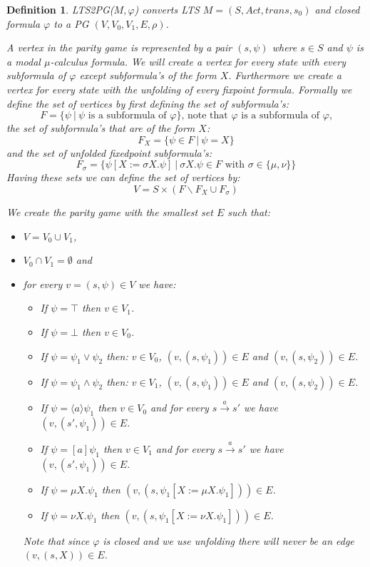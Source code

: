 \documentclass[]{article}
\newtheorem{definition}{Definition}[section]
\begin{document}
\begin{definition}
	\label{def_LTS2PG}\cite{Bradfield2018}
	LTS2PG($M, \varphi$) converts LTS $M = (S, Act, trans, s_0)$ and closed formula $\varphi$ to a PG $(V, V_0, V_1, E, \rho)$.
	
	A vertex in the parity game is represented by a pair $(s, \psi)$ where $s \in S$ and $\psi$ is a modal $\mu$-calculus formula. We will create a vertex for every state with every subformula of $\varphi$ except subformula's of the form $X$. Furthermore we create a vertex for every state with the unfolding of every fixpoint formula. Formally we define the set of vertices by first defining the set of subformula's:
	\[ F = \{ \psi\ |\ \psi \text{ is a subformula of } \varphi \} \text{, note that $\varphi$ is a subformula of $\varphi$,} \]
	the set of subformula's that are of the form $X$:
	\[ F_X = \{ \psi \in F\ |\ \psi = X\} \]
	and the set of unfolded fixedpoint subformula's:
	 \[ F_\sigma = \{\psi[X:=\sigma X. \psi]\ |\ \sigma X. \psi \in F \text{ with } \sigma \in \{\mu, \nu\}\} \]
	Having these sets we can define the set of vertices by:
	\[ V = S \times (F \backslash F_X \cup F_{\sigma})\]
	
	We create the parity game with the smallest set $E$ such that:
	\begin{itemize}
		\item $V = V_0 \cup V_1$,
		\item $V_0 \cap V_1 = \emptyset$ and
		\item for every $v = (s, \psi) \in V$ we have:
		\begin{itemize}
			\item If $\psi = \top$ then $v \in V_1$.
			\item If $\psi = \bot$ then $v \in V_0$.
			\item If $\psi = \psi_1 \vee \psi_2$ then:
				\subitem $v \in V_0$,
				\subitem $(v, (s,\psi_1)) \in E$ and
				\subitem $(v, (s,\psi_2)) \in E$.
			\item If $\psi = \psi_1 \wedge \psi_2$ then:
				\subitem $v \in V_1$,
				\subitem $(v, (s,\psi_1)) \in E$ and
				\subitem $(v, (s,\psi_2)) \in E$.
			\item If $\psi = \langle a \rangle \psi_1$ then $v \in V_0$ and for every $s \xrightarrow{ a} s'$ we have $(v, (s', \psi_1)) \in E$.
			\item If $\psi = [ a ] \psi_1$ then $v \in V_1$ and for every $s \xrightarrow{ a} s'$ we have  $(v, (s', \psi_1)) \in E$.
			\item If $\psi = \mu X. \psi_1$ then $(v, (s, \psi_1[X:=\mu X. \psi_1])) \in E$.
			\item If $\psi = \nu X. \psi_1$ then $(v, (s, \psi_1[X:=\nu X. \psi_1])) \in E$.
		\end{itemize}
	Note that since $\varphi$ is closed and we use unfolding there will never be an edge $(v,(s, X)) \in E$.
	\end{itemize}



\end{definition}
\end{document}

